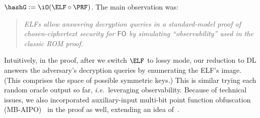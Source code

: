  $\hashG := \iO  (\ELF \circ\PRF)$. %
The main observation was: 
 \begin{quote}    \emph{ELFs allow answering decryption queries in a standard-model proof of chosen-ciphertext security for $\mathsf{FO}$ by simulating  ``observability'' used in the classic  ROM proof.}
 \end{quote}
Intuitively, in the proof, after we switch $\ELF$  to lossy mode, our reduction  to DL answers the adversary's decryption queries by enumerating the ELF's image. (This  comprises the space of   possible symmetric keys.) This is similar trying   each random oracle output so far, \emph{i.e.}~leveraging observability. 
Because of technical issues, we also incorporated auxiliary-input multi-bit point function obfuscation (MB-AIPO)~\cite{EC:CanDak08} in the proof as well, extending an idea of~\cite{AC:BrzMit14a}.


